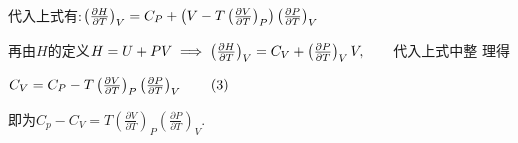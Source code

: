 \documentclass{ctexart}
\begin{document}
\bigskip 代入上式有:$\left( \frac{\partial H}{%
\partial T}\right) _{V}=C_{P}+\left( V-T\left( \frac{\partial V}{\partial T}%
\right) _{P}\right) \left( \frac{\partial P}{\partial T}\right) _{V}\qquad $

再由$H$的定义$H=U+PV\implies \left( \frac{%
\partial H}{\partial T}\right) _{V}=C_{V}+\left( \frac{\partial P}{\partial T%
}\right) _{V}V,\qquad $代入上式中整%
理得

$C_{V}=C_{P}-T\left( \frac{\partial V}{\partial T}\right) _{P}\left( \frac{%
\partial P}{\partial T}\right) _{V}\qquad \left( 3\right) $

即为$C_{p}-C_{V}=T\left( \frac{\partial V}{\partial T}\right)
_{P}\left( \frac{\partial P}{\partial T}\right) _{V}.$
\end{document}
